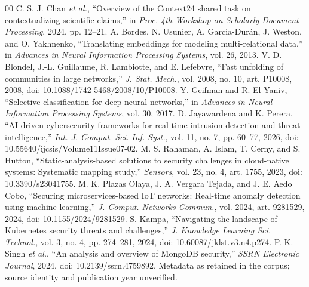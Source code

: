 \documentclass[conference,a4paper]{IEEEtran}
\begin{document}
\begin{thebibliography}{00}
 C. S. J. Chan \emph{et al.}, ``Overview of the Context24 shared task on contextualizing scientific claims,'' in \emph{Proc. 4th Workshop on Scholarly Document Processing}, 2024, pp. 12--21.
 A. Bordes, N. Usunier, A. Garcia-Dur\'an, J. Weston, and O. Yakhnenko, ``Translating embeddings for modeling multi-relational data,'' in \emph{Advances in Neural Information Processing Systems}, vol. 26, 2013.
 V. D. Blondel, J.-L. Guillaume, R. Lambiotte, and E. Lefebvre, ``Fast unfolding of communities in large networks,'' \emph{J. Stat. Mech.}, vol. 2008, no. 10, art. P10008, 2008, doi: 10.1088/1742-5468/2008/10/P10008.
 Y. Geifman and R. El-Yaniv, ``Selective classification for deep neural networks,'' in \emph{Advances in Neural Information Processing Systems}, vol. 30, 2017.
 D. Jayawardena and K. Perera, ``AI-driven cybersecurity frameworks for real-time intrusion detection and threat intelligence,'' \emph{Int. J. Comput. Sci. Inf. Syst.}, vol. 11, no. 7, pp. 60--77, 2026, doi: 10.55640/ijcsis/Volume11Issue07-02.
 M. S. Rahaman, A. Islam, T. Cerny, and S. Hutton, ``Static-analysis-based solutions to security challenges in cloud-native systems: Systematic mapping study,'' \emph{Sensors}, vol. 23, no. 4, art. 1755, 2023, doi: 10.3390/s23041755.
 M. K. Plazas Olaya, J. A. Vergara Tejada, and J. E. Aedo Cobo, ``Securing microservices-based IoT networks: Real-time anomaly detection using machine learning,'' \emph{J. Comput. Networks Commun.}, vol. 2024, art. 9281529, 2024, doi: 10.1155/2024/9281529.
 S. Kampa, ``Navigating the landscape of Kubernetes security threats and challenges,'' \emph{J. Knowledge Learning Sci. Technol.}, vol. 3, no. 4, pp. 274--281, 2024, doi: 10.60087/jklst.v3.n4.p274.
 P. K. Singh \emph{et al.}, ``An analysis and overview of MongoDB security,'' \emph{SSRN Electronic Journal}, 2024, doi: 10.2139/ssrn.4759892. Metadata as retained in the corpus; source identity and publication year unverified.
\end{thebibliography}
\end{document}
